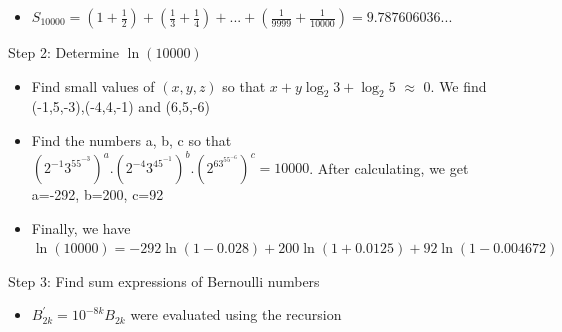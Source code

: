 \documentclass{article}
\begin{document}
\begin{multicols}{3}
\begin{itemize}
                \vspace{-0.2cm}\item $S_{10000}=(1+\frac{1}{2})+(\frac{1}{3}+\frac{1}{4})+...+(\frac{1}{9999}+\frac{1}{10000})=9.787606036...$
            \end{itemize}
            \vspace{-0.2cm}
            \Large Step 2: Determine $\ln{(10000)}$\\
            \vspace{-0.8cm}
            \begin{itemize}
                \item Find small values of $(x,y,z)$ so that $x+y\log_2{3}+\log_2{5}$ $\approx$ 0. We find (-1,5,-3),(-4,4,-1) and (6,5,-6)
                \vspace{-0.2cm}\item Find the numbers a, b, c so that $(2^{-1}3^55^{-3})^a.(2^{-4}3^45^{-1})^b.(2^63^55^{-6})^c=10000$. After calculating, we get a=-292, b=200, c=92 
                \vspace{-0.2cm}\item Finally, we have $\ln{(10000)}=-292\ln{(1-0.028)}+200\ln{(1+0.0125)}+92\ln{(1-0.004672)}$
            \end{itemize}
            \hspace{-0.3cm}
            \colorbox{marronrp3}{
                \begin{minipage}[t]{.98\linewidth}
                    
            \Large Step 3: Find sum expressions of Bernoulli numbers\\
            \vspace{-1cm}
            \begin{itemize}
                \item $B_{2k}^{'}=10^{-8k}{B_{2k}}$ were evaluated using the recursion
                

\end{itemize}
\end{minipage}}
\end{multicols}
\end{document}
